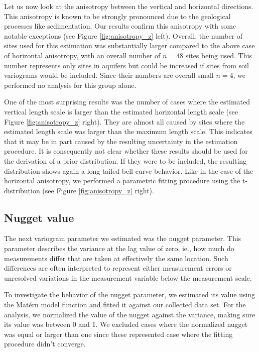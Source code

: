 \documentclass{article}
\begin{document}
Let us now look at the anisotropy between the vertical and horizontal directions. This anisotropy is known to be strongly pronounced due to the geological processes like sedimentation. Our results confirm this anisotropy with some notable exceptions (see Figure \ref{fig:anisotropy_z} left). Overall, the number of sites used for this estimation was substantially larger compared to the above case of horizontal anisotropy, with an overall number of $n=48$ sites being used. This number represents only sites in aquifers but could be increased if sites from soil variograms would be included. Since their numbers are overall small $n=4$, we performed no analysis for this group alone.

One of the most surprising results was the number of cases where the estimated vertical length scale is larger than the estimated horizontal length scale (see Figure \ref{fig:anisotropy_z} right). They are almost all caused by sites where the estimated length scale was larger than the maximum length scale. This indicates that it may be in part caused by the resulting uncertainty in the estimation procedure. It is consequently not clear whether these results should be used for the derivation of a prior distribution. If they were to be included, the resulting distribution shows again a long-tailed bell curve behavior. Like in the case of the horizontal anisotropy, we performed a parametric fitting procedure using the t-distribution (see Figure \ref{fig:anisotropy_z} right).


\subsection{Nugget value}

The next variogram parameter we estimated was the nugget parameter. This parameter describes the variance at the lag value of zero, ie., how much do measurements differ that are taken at effectively the same location. Such differences are often interpreted to represent either measurement errors or unresolved variations in the measurement variable below the measurement scale.

To investigate the behavior of the nugget parameter, we estimated its value using the Mat{\'e}rn model function and fitted it against our collected data set. For the analysis, we normalized the value of the nugget against the variance, making sure its value was between $0$ and $1$. We excluded cases where the normalized nugget was equal or larger than one since these represented case where the fitting procedure didn't converge. 
\end{document}
